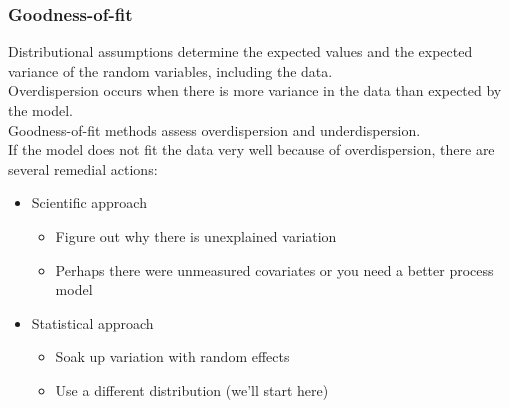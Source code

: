 \documentclass[color=usenames,dvipsnames]{beamer}\usepackage[]{graphicx}\usepackage[]{color}
\begin{document}
\begin{frame}
  \frametitle{Goodness-of-fit}
  \small
  Distributional assumptions determine the expected values
  \alert{and the expected variance} of the random variables, including
  the data. \\  
  \pause
  \vfill
  Overdispersion occurs when there is more variance in the data than
  expected by the model. \\
  \pause
  \vfill
  Goodness-of-fit methods assess overdispersion and underdispersion. \\
  \pause
  \vfill
  If the model does not fit the data very well because of
  overdispersion, there are several remedial actions:
  \begin{itemize}
  \item<5-> Scientific approach
    \begin{itemize}
       \item Figure out why there is unexplained variation
       \item Perhaps there were unmeasured covariates or you need a
         better process model
    \end{itemize}
  \item<6-> Statistical approach
    \begin{itemize}
      \item Soak up variation with random effects
      \item Use a different distribution (we'll start here)
    \end{itemize}
  \end{itemize}
\end{frame}
\end{document}
